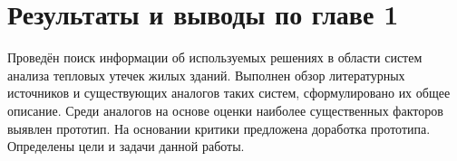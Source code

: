 

\section{Результаты и выводы по главе 1}

\par

	Проведён поиск информации об используемых решениях в области систем анализа тепловых утечек жилых зданий. Выполнен обзор литературных источников и существующих аналогов таких систем, сформулировано их общее описание. Среди аналогов на основе оценки наиболее существенных факторов выявлен прототип. На основании критики предложена доработка прототипа. Определены цели и задачи данной работы.
